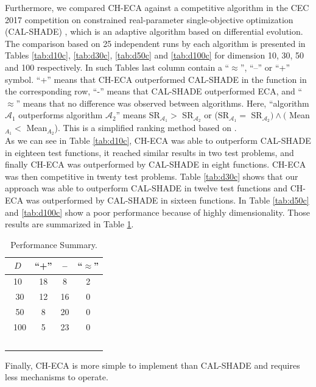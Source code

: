 \documentclass[conference]{IEEEtran}
\begin{document}
Furthermore, we compared CH-ECA against a  competitive algorithm in 
the CEC 2017 competition on constrained real-parameter single-objective optimization (CAL-SHADE) \cite{zamuda2017adaptive}, which is an adaptive algorithm based on differential evolution. The comparison based on 25 independent runs by each algorithm is presented in Tables \ref{tab:d10c}, \ref{tab:d30c}, \ref{tab:d50c} and \ref{tab:d100c} for dimension 10, 30, 50 and 100 respectively. In such Tables last column contain a ``$\approx$'', ``--'' or ``+'' symbol. ``+'' means that CH-ECA outperformed CAL-SHADE in the function  %
	in the corresponding row, ``-'' means that CAL-SHADE outperformed ECA, and  %
	``$\approx$'' means that no difference was observed between algorithms. Here, ``algorithm $\mathcal{A}_1$ outperforms algorithm $\mathcal{A}_2$'' means SR$_{\mathcal{A}_1} > $ SR$_{\mathcal{A}_2}$ or (SR$_{\mathcal{A}_1} = $ SR$_{\mathcal{A}_2}) \wedge ($ Mean$_{A_1} < $ Mean$_{A_2}$). This is a simplified ranking method based on \cite{cecCop17}. \\

As we can see in Table \ref{tab:d10c}, CH-ECA was able to outperform CAL-SHADE in eighteen test functions, it reached similar results in two test problems, and finally CH-ECA was outperformed by CAL-SHADE in eight functions. CH-ECA was then competitive in twenty test problems. %
%
Table \ref{tab:d30c} shows that our approach was able to outperform CAL-SHADE in twelve test functions and CH-ECA was outperformed by CAL-SHADE in sixteen functions.
%
In Table \ref{tab:d50c} and \ref{tab:d100c} show a poor performance because of highly dimensionality. Those results are summarized in Table \ref{tab:summary}.

\begin{table}[!ht]
	\caption{Performance Summary.}
	\label{tab:summary}
	\centering
	\begin{tabular}{c|ccc}
		$D$ & ``+'' &  -- & ``$\approx$'' \\ \hline
		10  & 18    &  8  & 2  \\ \
		30  & 12    &  16 & 0  \\ \
		50  & 8     &  20 & 0 \\ \
	   100  & 5     &  23 & 0  \\ \
	\end{tabular}
\end{table}


Finally, CH-ECA is more simple to implement than CAL-SHADE and requires less 
mechanisms to operate.
\end{document}
